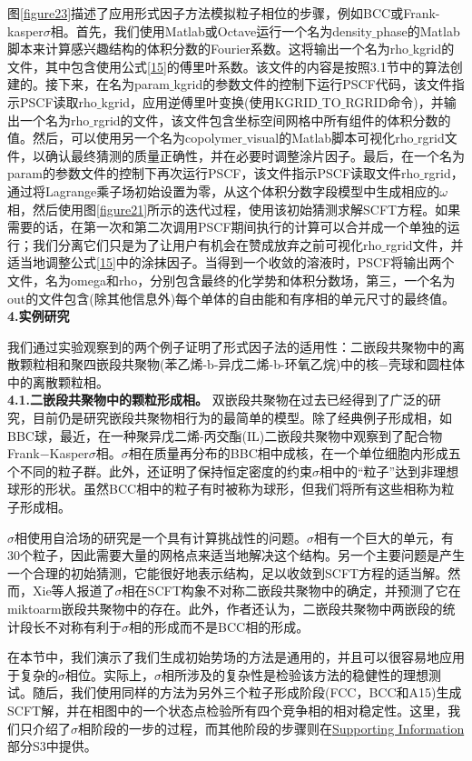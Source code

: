 \documentclass[12pt,a4paper]{article}
\begin{document}
图\ref{figure23}描述了应用形式因子方法模拟粒子相位的步骤，例如BCC或Frank-kasper$\sigma$相。首先，我们使用Matlab或Octave运行一个名为density$\_$phase的Matlab脚本来计算感兴趣结构的体积分数的Fourier系数。这将输出一个名为rho$\_$kgrid的文件，其中包含使用公式\ref{15}的傅里叶系数。该文件的内容是按照3.1节中的算法创建的。接下来，在名为param$\_$kgrid的参数文件的控制下运行PSCF代码，该文件指示PSCF读取rho$\_$kgrid，应用逆傅里叶变换(使用KGRID$\_$TO$\_$RGRID命令)，并输出一个名为rho$\_$rgrid的文件，该文件包含坐标空间网格中所有组件的体积分数的值。然后，可以使用另一个名为copolymer$\_$visual的Matlab脚本可视化rho$\_$rgrid文件，以确认最终猜测的质量正确性，并在必要时调整涂片因子。最后，在一个名为param的参数文件的控制下再次运行PSCF，该文件指示PSCF读取文件rho$\_$rgrid，通过将Lagrange乘子场初始设置为零，从这个体积分数字段模型中生成相应的$\omega$相，然后使用图\ref{figure21}所示的迭代过程，使用该初始猜测求解SCFT方程。如果需要的话，在第一次和第二次调用PSCF期间执行的计算可以合并成一个单独的运行；我们分离它们只是为了让用户有机会在赞成放弃之前可视化rho$\_$rgrid文件，并适当地调整公式\ref{15}中的涂抹因子。当得到一个收敛的溶液时，PSCF将输出两个文件，名为omega和rho，分别包含最终的化学势和体积分数场，第三，一个名为out的文件包含(除其他信息外)每个单体的自由能和有序相的单元尺寸的最终值。\\
\textbf{4.实例研究}

我们通过实验观察到的两个例子证明了形式因子法的适用性：二嵌段共聚物中的离散颗粒相和聚四嵌段共聚物(苯乙烯-b-异戊二烯-b-环氧乙烷)中的核−壳球和圆柱体中的离散颗粒相。\\
\textbf{4.1.二嵌段共聚物中的颗粒形成相。}
双嵌段共聚物在过去已经得到了广泛的研究，目前仍是研究嵌段共聚物相行为的最简单的模型。除了经典例子形成相，如BBC球，最近，在一种聚异戊二烯-丙交酯(IL)二嵌段共聚物中观察到了配合物Frank−Kasper$\sigma$相。$\sigma$相在质量再分布的BBC相中成核，在一个单位细胞内形成五个不同的粒子群。此外，还证明了保持恒定密度的约束$\sigma$相中的“粒子”达到非理想球形的形状。虽然BCC相中的粒子有时被称为球形，但我们将所有这些相称为粒子形成相。

$\sigma$相使用自洽场的研究是一个具有计算挑战性的问题。$\sigma$相有一个巨大的单元，有30个粒子，因此需要大量的网格点来适当地解决这个结构。另一个主要问题是产生一个合理的初始猜测，它能很好地表示结构，足以收敛到SCFT方程的适当解。然而，Xie等人报道了$\sigma$相在SCFT构象不对称二嵌段共聚物中的确定，并预测了它在miktoarm嵌段共聚物中的存在。此外，作者还认为，二嵌段共聚物中两嵌段的统计段长不对称有利于$\sigma$相的形成而不是BCC相的形成。


在本节中，我们演示了我们生成初始势场的方法是通用的，并且可以很容易地应用于复杂的$\sigma$相位。实际上，$\sigma$相所涉及的复杂性是检验该方法的稳健性的理想测试。随后，我们使用同样的方法为另外三个粒子形成阶段(FCC，BCC和A15)生成SCFT解，并在相图中的一个状态点检验所有四个竞争相的相对稳定性。这里，我们只介绍了$\sigma$相阶段的一步的过程，而其他阶段的步骤则在\href{http://pubs.acs.org/doi/suppl/10.1021/acs.macromol.6b00107/suppl_file/ma6b00107_si_001.pdf}{Supporting Information}部分S3中提供。
\end{document}
